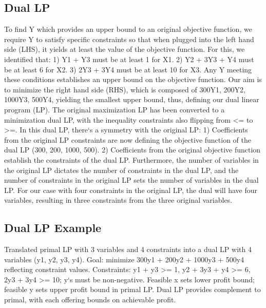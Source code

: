 \subsection*{Dual LP}
To find Y which provides an upper bound to an original objective function, we require Y to satisfy specific constraints so that when plugged into the left hand side (LHS), it yields at least the value of the objective function.
For this, we identified that: 1) Y1 + Y3 must be at least 1 for X1.
2) Y2 + 3Y3 + Y4 must be at least 6 for X2.
3) 2Y3 + 3Y4 must be at least 10 for X3.
Any Y meeting these conditions establishes an upper bound on the objective function.
Our aim is to minimize the right hand side (RHS), which is composed of 300Y1, 200Y2, 1000Y3, 500Y4, yielding the smallest upper bound, thus, defining our dual linear program (LP).
The original maximization LP has been converted to a minimization dual LP, with the inequality constraints also flipping from \textless{}= to \textgreater{}=.
In this dual LP, there`s a symmetry with the original LP: 1) Coefficients from the original LP constraints are now defining the objective function of the dual LP (300, 200, 1000, 500).
2) Coefficients from the original objective function establish the constraints of the dual LP\@.
Furthermore, the number of variables in the original LP dictates the number of constraints in the dual LP, and the number of constraints in the original LP sets the number of variables in the dual LP\@.
For our case with four constraints in the original LP, the dual will have four variables, resulting in three constraints from the three original variables.

\subsection*{Dual LP Example}
Translated primal LP with 3 variables and 4 constraints into a dual LP with 4 variables (y1, y2, y3, y4).
Goal: minimize 300y1 + 200y2 + 1000y3 + 500y4 reflecting constraint values.
Constraints: y1 + y3 \textgreater{}= 1, y2 + 3y3 + y4 \textgreater{}= 6, 2y3 + 3y4 \textgreater{}= 10; y`s must be non-negative.
Feasible x sets lower profit bound; feasible y sets upper profit bound in primal LP\@.
Dual LP provides complement to primal, with each offering bounds on achievable profit.

